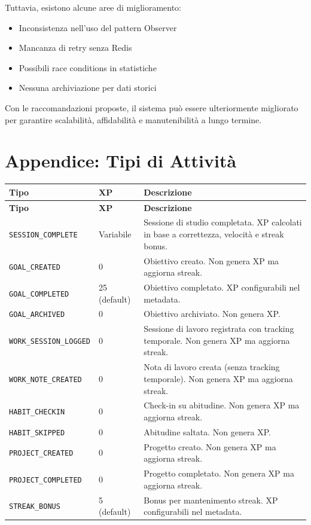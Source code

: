 \documentclass[11pt,a4paper]{article}
\begin{document}
Tuttavia, esistono alcune aree di miglioramento:

\begin{itemize}
    \item Inconsistenza nell'uso del pattern Observer
    \item Mancanza di retry senza Redis
    \item Possibili race conditions in statistiche
    \item Nessuna archiviazione per dati storici
\end{itemize}

Con le raccomandazioni proposte, il sistema può essere ulteriormente migliorato per garantire scalabilità, affidabilità e manutenibilità a lungo termine.

\section{Appendice: Tipi di Attività}

\begin{longtable}{|p{4cm}|p{3cm}|p{8cm}|}
\hline
\textbf{Tipo} & \textbf{XP} & \textbf{Descrizione} \\
\hline
\endfirsthead
\hline
\textbf{Tipo} & \textbf{XP} & \textbf{Descrizione} \\
\hline
\endhead
\hline
\endfoot
\hline
\endlastfoot
\texttt{SESSION\_COMPLETE} & Variabile & Sessione di studio completata. XP calcolati in base a correttezza, velocità e streak bonus. \\
\hline
\texttt{GOAL\_CREATED} & 0 & Obiettivo creato. Non genera XP ma aggiorna streak. \\
\hline
\texttt{GOAL\_COMPLETED} & 25 (default) & Obiettivo completato. XP configurabili nel metadata. \\
\hline
\texttt{GOAL\_ARCHIVED} & 0 & Obiettivo archiviato. Non genera XP. \\
\hline
\texttt{WORK\_SESSION\_LOGGED} & 0 & Sessione di lavoro registrata con tracking temporale. Non genera XP ma aggiorna streak. \\
\hline
\texttt{WORK\_NOTE\_CREATED} & 0 & Nota di lavoro creata (senza tracking temporale). Non genera XP ma aggiorna streak. \\
\hline
\texttt{HABIT\_CHECKIN} & 0 & Check-in su abitudine. Non genera XP ma aggiorna streak. \\
\hline
\texttt{HABIT\_SKIPPED} & 0 & Abitudine saltata. Non genera XP. \\
\hline
\texttt{PROJECT\_CREATED} & 0 & Progetto creato. Non genera XP ma aggiorna streak. \\
\hline
\texttt{PROJECT\_COMPLETED} & 0 & Progetto completato. Non genera XP ma aggiorna streak. \\
\hline
\texttt{STREAK\_BONUS} & 5 (default) & Bonus per mantenimento streak. XP configurabili nel metadata. \\
\hline
\end{longtable}
\end{document}
